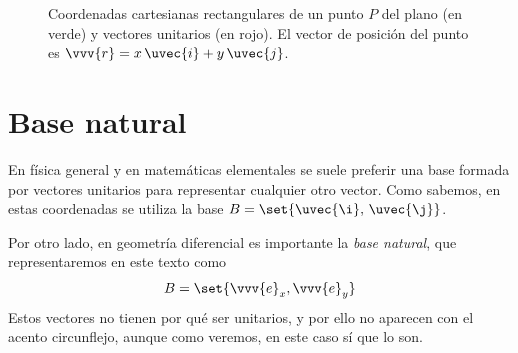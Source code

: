 \begin{figure}[ht]
  \caption{Coordenadas cartesianas rectangulares de un punto $P$ del plano
    (en verde) y vectores unitarios (en rojo). El vector de posición del punto
    es $\vvv{r} = x\,\uvec{i} + y\,\uvec{j}$.}
  \label{fig:R2-rect_ij}
\end{figure}


\section{Base natural}
En física general y en matemáticas elementales se suele preferir una base
formada por vectores unitarios para representar cualquier otro vector.
Como sabemos, en estas coordenadas se utiliza la base
$B = \set{\uvec{\i},\,\uvec{\j}}$.

Por otro lado, en geometría diferencial es importante la \emph{base natural},
que representaremos en este texto como
\begin{equation}
  B = \set{\vvv{e}_x, \vvv{e}_y}
\end{equation}
Estos vectores no tienen por qué ser unitarios, y por ello no aparecen con el
acento circunflejo, aunque como veremos, en este caso sí que lo son.

